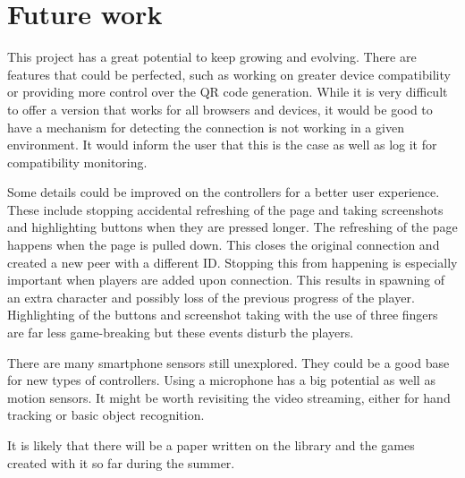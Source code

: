 \documentclass{l4proj}
\begin{document}
\section{Future work}
This project has a great potential to keep growing and evolving. There are features that could be perfected, such as working on greater device compatibility or providing more control over the QR code generation. While it is very difficult to offer a version that works for all browsers and devices, it would be good to have a mechanism for detecting the connection is not working in a given environment. It would inform the user that this is the case as well as log it for compatibility monitoring. \par
Some details could be improved on the controllers for a better user experience. These include stopping accidental refreshing of the page and taking screenshots and highlighting buttons when they are pressed longer. The refreshing of the page happens when the page is pulled down. This closes the original connection and created a new peer with a different ID. Stopping this from happening is especially important when players are added upon connection. This results in spawning of an extra character and possibly loss of the previous progress of the player. Highlighting of the buttons and screenshot taking with the use of three fingers are far less game-breaking but these events disturb the players. \par 
There are many smartphone sensors still unexplored. They could be a good base for new types of controllers. Using a microphone has a big potential as well as motion sensors. It might be worth revisiting the video streaming, either for hand tracking or basic object recognition. \par 
It is likely that there will be a paper written on the library and the games created with it so far during the summer.





%
% 
\end{document}
